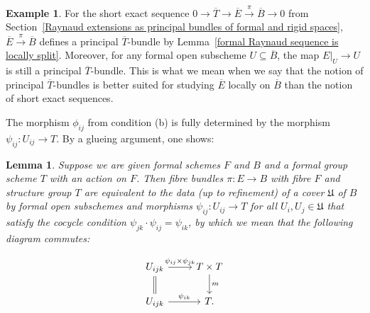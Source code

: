 \documentclass[10pt,oneside]{amsart}
\newtheorem{lemma}[theorem]{Lemma}
\theoremstyle{definition}
\newtheorem*{example}{Example}
\begin{document}
	\begin{example}
		For the short exact sequence $0\rightarrow \overline{T}\rightarrow \overline{E}\xrightarrow{\pi} \overline{B}\rightarrow 0$ from Section~\ref{Raynaud extensions as principal bundles of formal and rigid spaces}, $\overline{E}\xrightarrow{\pi} \overline{B}$ defines a principal $\overline{T}$-bundle by Lemma~\ref{formal Raynaud sequence is locally split}. Moreover, for any formal open subscheme $U\subseteq \overline{B}$, the map $E|_U\rightarrow U$ is still a principal $\overline{T}$-bundle. This is what we mean when we say that the notion of principal $\overline{T}$-bundles is better suited for studying $\overline{E}$ locally on $\overline{B}$ than the notion of short exact sequences.
	\end{example}
	
	The morphism $\phi_{ij}$ from condition (b) is fully determined by the morphism $\psi_{ij}:U_{ij}\rightarrow T$. By a glueing argument, one shows:
	\begin{lemma}\label{equivalent characterisation of principal $T$-bundle}
		Suppose we are given formal schemes $F$ and $B$ and a formal group scheme $T$ with an action on $F$. Then fibre bundles $\pi:E\rightarrow B$ with fibre $F$ and structure group $T$ are equivalent to the data (up to refinement) of a cover $\mathfrak U$ of $B$ by formal open subschemes and morphisms $\psi_{ij}:U_{ij}\rightarrow T$ for all $U_i,U_j\in \mathfrak U$ that satisfy the cocycle condition $\psi_{jk}\cdot \psi_{ij}=\psi_{ik}$, by which we mean that the following diagram commutes:
		
		\begin{center}\begin{equation}		\label{cocycle condition of fibre bundle}
			\begin{tikzcd}
			U_{ijk} \arrow[r, "\psi_{ij}\times\psi_{jk}"] \arrow[d,equal] & T\times T \arrow[d, "m"] \\
			U_{ijk} \arrow[r, "\psi_{ik}"] & T.
			\end{tikzcd}
			\end{equation}
		\end{center}
	\end{lemma}
	
\end{document}
